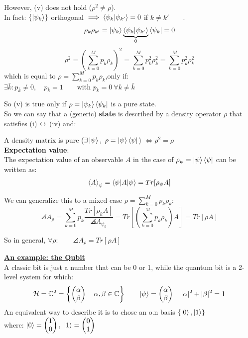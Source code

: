 However, (v) does not hold ($\rho^2 \ne \rho$).\\
In fact: $\{\left|\psi_k\right\rangle\}$ orthogonal $\implies \left\langle \psi_k \middle| \psi_{k'} \right\rangle= 0$ if $k \ne k' \qquad $.
$$\rho_k\rho_{k'} = \left|\psi_k\right\rangle\underbrace{\left\langle \psi_k \middle| \psi_{k'} \right\rangle}_0 \left\langle\psi_k\right| = 0$$
$$ \rho^2 = \left(\sum_{k=0}^M p_k\rho_k\right)^2 = \sum_{k=0}^M p_k^2 \rho_k^2 = \sum_{k=0}^M p_k^2 \rho_k^2 $$
which is equal to $\rho = \sum_{k=0}^M p_k\rho_k$,\quad  only if:\\
$\exists\bar k : p_{\bar k} \ne 0 ,\quad  p_{\bar k} = 1 \qquad \text{with } p_k = 0 \ \forall k \ne \bar k$

So (v) is true only if $\rho = \left|\psi_k\right\rangle\left\langle\psi_k\right|$ is a pure state.\\

So we can say that a (generic) \textbf{state} is described by a density operator $\rho$ that satisfies (i) $\leftrightarrow$ (iv) and:

\Th A density matrix is pure ($\exists \left|\psi\right\rangle, \ \rho = \left|\psi\right\rangle\left\langle\psi\right|$)  $\iff \rho^2 = \rho$\\

\textbf{Expectation value}:\\
The expectation value of an observable $A$ in the case of $\rho_\psi = \left|\psi\right\rangle\left\langle\psi\right|$ can be written as:
$$\left<A\right>_\psi = \left\langle \psi \middle| A \middle| \psi \right\rangle = Tr[\rho_\psi A]$$

We can generalize this to a mixed case $\rho = \sum_{k=0}^M p_k\rho_k$:
$$ \angles A_\rho = \sum_{k=0}^M p_k \frac{Tr[\rho_k A]}{\angles A_{\psi_k}} = Tr\left[\left(\sum_{k=0}^M p_k\rho_k\right)A\right] = Tr[\rho A]$$

So in general, $\forall \rho: \qquad \angles A_\rho = Tr[\rho A]$

\vspace{20pt}

\underline{\textbf{An example: the Qubit}}\\
A classic bit is just a number that can be 0 or 1, while the quantum bit is a 2-level system for which:
$$\mathcal{H} = \mathbb{C}^2 = \left\{\begin{pmatrix}\alpha\\\beta\end{pmatrix} \quad \alpha,\beta \in \mathbb{C}\right\} \qquad \left|\psi\right\rangle = \begin{pmatrix}\alpha\\\beta\end{pmatrix} \quad |\alpha|^2 + |\beta|^2 = 1 $$
An equivalent way to describe it is to chose an o.n basis $\{\left|0\right\rangle, \left|1\right\rangle\}$\\ where: $\left|0\right\rangle = \begin{pmatrix}1\\0\end{pmatrix}, \ \left|1\right\rangle = \begin{pmatrix}0\\1\end{pmatrix}$

